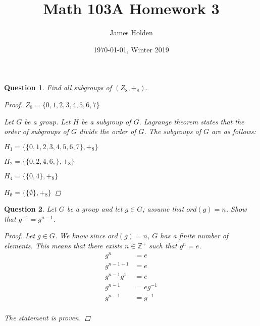 \documentclass{article}
\title{Math 103A Homework 3}
\date{\today $ $, Winter 2019}
\author{James Holden}
\newcommand*{\field}[1]{\mathbb{#1}}%
\newtheorem{ques}{Question}
\begin{document}
\maketitle

\begin{ques}
	Find all subgroups of $(Z_8, +_8)$.	
	\begin{proof}
		$Z_8 = \{0, 1, 2, 3, 4, 5, 6, 7\}$
		
	Let $G$ be a group. Let $H$ be a subgroup of $G$. Lagrange theorem states that the order of subgroups of $G$ divide the order of $G$. The subgroups of $G$ are as follows:
	
	$H_1 = \{\{0, 1, 2, 3, 4, 5, 6, 7\}, +_8\}$

	$H_2 = \{\{0, 2, 4, 6,\}, +_8\}$

	$H_4 = \{\{0, 4\}, +_8\}$

	$H_\emptyset = \{\{\emptyset\}, +_8\}$

	\end{proof}
\end{ques}

\begin{ques}
		Let $G$ be a group and let $g \in G$; assume that $ord(g) = n$. Show that $g^{-1} = g^{n-1}$.
	\begin{proof}
		Let $g \in G$. We know since $ord(g) = n$, $G$ has a finite number of elements. This means that there exists $n \in \field{Z}^+$ such that $g^n = e$. 
		\begin{align*}
		g^n &= e \\
		g^{n - 1 + 1} &=e \\
		g^{n - 1} g^1 &= e \\
		g^{n-1} &= eg^{-1} \\
		g^{n-1} &= g^{-1} \\
		\end{align*}
		
	The statement is proven.
	\end{proof}
\end{ques}
\end{document}
